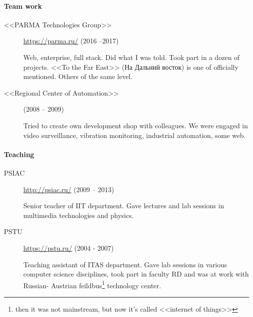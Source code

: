 \documentclass [a4paper,10pt]{article}
\begin{document}
\paragraph{Team work}
\begin{description}
\item[<<PARMA Technologies Group>>] \url{https://parma.ru/} (2016 --2017)
	
Web, enterprise, full stack. Did what I was told. Took part in a dozen
of projects. <<To the Far East>> (На Дальний восток) is one of officially
mentioned. Others of the same level.

\item[<<Regional Center of Automation>>] (2008 -- 2009)

Tried to create own development shop with colleagues. We were engaged in video surveillance, vibration monitoring, industrial automation, some web.
\end{description}

\paragraph{Teaching}
\begin{description}
\item[PSIAC] \url{http://psiac.ru/} (2009 -- 2013)

Senior teacher of IIT department. Gave lectures and lab sessions in multimedia
technologies and physics.

\item[PSTU] \url{https://pstu.ru/} (2004 - 2007)

Teaching assistant of ITAS department. Gave lab sessions in various computer
science disciplines, took part in faculty RD and was at work with Russian-
Austrian feildbus\footnote{then it was not mainstream, but
	now it's called <<internet of things>>} technology center.
\end{description}
\end{document}
